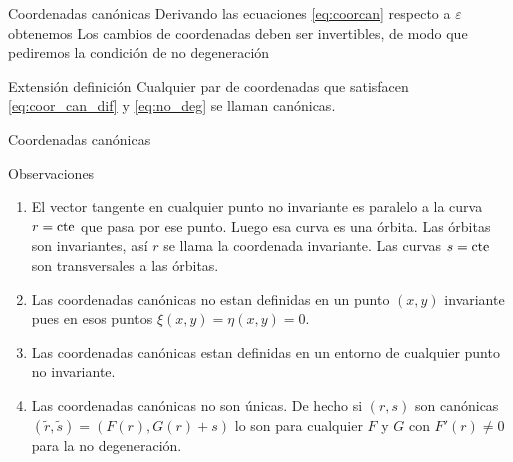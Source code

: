 \documentclass[handout,hyperref={colorlinks=true}]{beamer}
\renewcommand{\emph}[1]{\textcolor[rgb]{1,0,0}{#1}}
\renewcommand{\epsilon}{\varepsilon}
\newcommand{\nl}{\onslide<+-> }
\begin{document}
\begin{frame}{Coordenadas canónicas}
\nl Derivando las ecuaciones \eqref{eq:coorcan} respecto a $\epsilon$ obtenemos
\nl Los cambios de coordenadas deben ser invertibles, de modo que pediremos la condición de no degeneración

\nl \begin{block}{Extensión definición}
Cualquier par de coordenadas que satisfacen \eqref{eq:coor_can_dif} y \eqref{eq:no_deg} se llaman canónicas.
\end{block}



\end{frame}


\begin{frame}{Coordenadas canónicas}

 \begin{block}{Observaciones}
\begin{enumerate}
\item<+->El vector tangente en cualquier punto no invariante es paralelo a la curva $r=\hbox{cte}$ que pasa por ese punto. Luego esa curva es una órbita. Las órbitas son invariantes, así  $r$ se llama la \emph{coordenada invariante}. Las curvas $s=\hbox{cte}$ son transversales a las órbitas.
\item<+-> Las coordenadas canónicas no estan definidas en un punto $(x,y)$ invariante pues en esos puntos $\xi(x,y)=\eta(x,y)=0$.

\item<+-> Las coordenadas canónicas estan definidas en un entorno de cualquier   punto no invariante.

\item<+-> Las coordenadas canónicas no son únicas. De hecho si $(r,s)$ son canónicas $(\tilde{r},\tilde{s})=(F(r),G(r)+s)$ lo son para cualquier $F$ y $G$ con $F'(r)\neq 0$ para la no degeneración.

\end{enumerate}
\end{block}



\end{frame}
\end{document}
